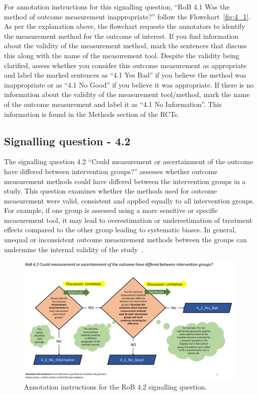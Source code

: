 \documentclass[sn-mathphys,Numbered]{sn-jnl}%
\begin{document}
For annotation instructions for this signalling question, ``RoB 4.1 Was the method of outcome measurement inappropriate?'' follow the Flowchart~\ref{fig:4_1}.
As per the explanation above, the flowchart requests the annotators to identify the measurement method for the outcome of interest.
If you find information about the validity of the measurement method, mark the sentences that discuss this along with the name of the measurement tool.
Despite the validity being clarified, assess whether you consider this outcome measurement as appropriate and label the marked sentences as ``4.1 Yes Bad'' if you believe the method was inappropriate or as ``4.1 No Good'' if you believe it was appropriate.
If there is no information about the validity of the measurement tool/method, mark the name of the outcome measurement and label it as ``4.1 No Information''.
This information is found in the Methods section of the RCTs.
%
%
%
\subsection*{Signalling question - 4.2 }
\label{subsec:4_2}
%
The signalling question 4.2 ``Could measurement or ascertainment of the outcome have differed between intervention groups?'' assesses whether outcome measurement methods could have differed between the intervention groups in a study.
This question examines whether the methods used for outcome measurement were valid, consistent and applied equally to all intervention groups.
For example, if one group is assessed using a more sensitive or specific measurement tool, it may lead to overestimation or underestimation of treatment effects compared to the other group leading to systematic biases.
In general, unequal or inconsistent outcome measurement methods between the groups can undermine the internal validity of the study~\cite{enwald2010preventing}. %

%
%
%
\begin{figure}[hbt]
    \centering
    \includegraphics[width=\textwidth]{figures/4_2.pdf}
    \caption{Annotation instructions for the RoB 4.2 signalling question.}
    \label{fig:4_2}
\end{figure}
%
%
%
\end{document}
